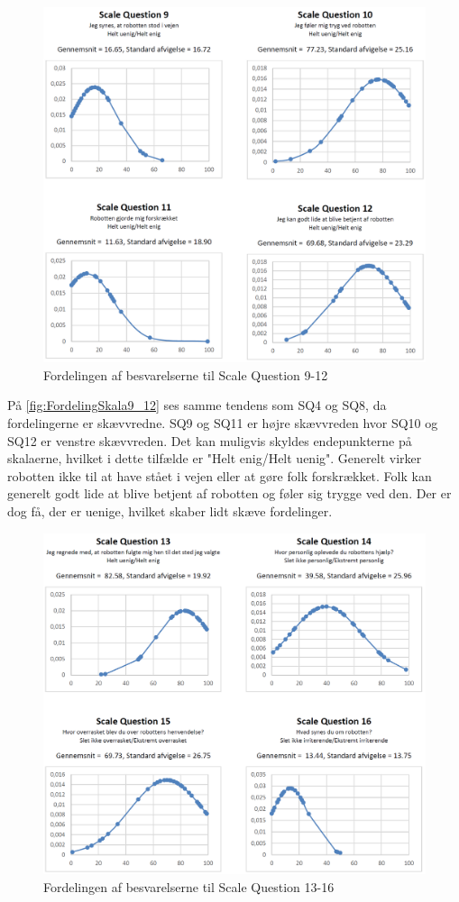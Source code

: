 %
\begin{figure}[H]
\centering
\includegraphics[width =\textwidth]{Figure/DatabehandlingSkalaer/FordelingSkala9_12} 
\caption{Fordelingen af besvarelserne til Scale Question 9-12}
\label{fig:FordelingSkala9_12}
\end{figure}
\noindent
%
På \autoref{fig:FordelingSkala9_12} ses samme tendens som SQ4 og SQ8, da fordelingerne er skævvredne. SQ9 og SQ11 er højre skævvreden hvor SQ10 og SQ12 er venstre skævvreden.  Det kan muligvis skyldes endepunkterne på skalaerne, hvilket i dette tilfælde er "Helt enig/Helt uenig". Generelt virker robotten ikke til at have stået i vejen eller at gøre folk forskrækket. Folk kan generelt godt lide at blive betjent af robotten og føler sig trygge ved den. Der er dog få, der er uenige, hvilket skaber lidt skæve fordelinger.
%
\begin{figure}[H]
\centering
\includegraphics[width =\textwidth]{Figure/DatabehandlingSkalaer/FordelingSkala13_16} 
\caption{Fordelingen af besvarelserne til Scale Question 13-16}
\label{fig:FordelingSkala13_16}
\end{figure}
